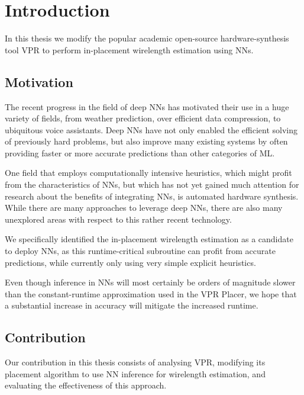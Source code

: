 
\chapter{Introduction}\label{ch:introduction}
\glsresetall %

In this thesis we modify the popular academic open-source hardware-synthesis tool \gls{VPR}\cite{vtr8} to perform in-placement wirelength estimation using \glspl{NN}.

\section{Motivation}

The recent progress in the field of deep \glspl{NN} has motivated their use in a huge variety of fields, from weather prediction, over efficient data compression, to ubiquitous voice assistants. Deep \glspl{NN} have not only enabled the efficient solving of previously hard problems, but also improve many existing systems by often providing faster or more accurate predictions than other categories of \gls{ML}.

One field that employs computationally intensive heuristics, which might profit from the characteristics of \glspl{NN}, but which has not yet gained much attention for research about the benefits of integrating \glspl{NN}, is automated hardware synthesis. While there are many approaches to leverage deep \glspl{NN}, there are also many unexplored areas with respect to this rather recent technology.

We specifically identified the in-placement wirelength estimation as a candidate to deploy \glspl{NN}, as this runtime-critical subroutine can profit from accurate predictions, while currently only using very simple explicit heuristics.

Even though inference in \glspl{NN} will most certainly be orders of magnitude slower than the constant-runtime approximation used in the \gls{VPR} Placer, we hope that a substantial increase in accuracy will mitigate the increased runtime.

\section{Contribution}

Our contribution in this thesis consists of analysing \gls{VPR}, modifying its placement algorithm to use \gls{NN} inference for wirelength estimation, and evaluating the effectiveness of this approach.

